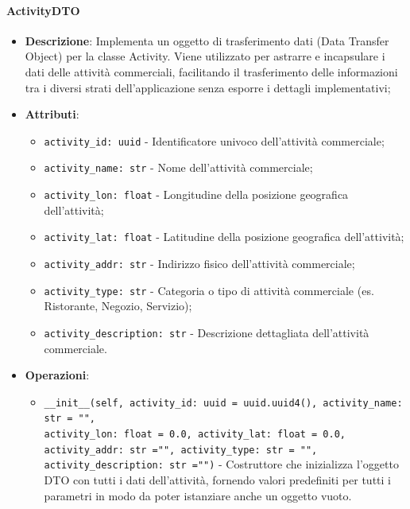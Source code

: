 \documentclass[10pt]{article}
\begin{document}
    \paragraph{ActivityDTO}
    \begin{itemize} 
    \item \textbf{Descrizione}: Implementa un oggetto di trasferimento dati (Data Transfer Object) per la classe Activity. Viene utilizzato per astrarre e incapsulare i dati delle attività commerciali, facilitando il trasferimento delle informazioni tra i diversi strati dell'applicazione senza esporre i dettagli implementativi;
    \item \textbf{Attributi}:
    \begin{itemize}
        \item \texttt{activity\_id: uuid} - Identificatore univoco dell'attività commerciale;
        \item \texttt{activity\_name: str} - Nome dell'attività commerciale;
        \item \texttt{activity\_lon: float} - Longitudine della posizione geografica dell'attività;
        \item \texttt{activity\_lat: float} - Latitudine della posizione geografica dell'attività;
        \item \texttt{activity\_addr: str} - Indirizzo fisico dell'attività commerciale;
        \item \texttt{activity\_type: str} - Categoria o tipo di attività commerciale (es. Ristorante, Negozio, Servizio);
        \item \texttt{activity\_description: str} - Descrizione dettagliata dell'attività commerciale.
    \end{itemize}
    
    \item \textbf{Operazioni}:
    \begin{itemize}
        \item \texttt{\_\_init\_\_(self, activity\_id: uuid = uuid.uuid4(), activity\_name: str = "",\\ activity\_lon: float = 0.0, activity\_lat: float = 0.0, activity\_addr: str ="", activity\_type: str = "", activity\_description: str ="")} - Costruttore che inizializza l'oggetto DTO con tutti i dati dell'attività, fornendo valori predefiniti per tutti i parametri in modo da poter istanziare anche un oggetto vuoto.
    \end{itemize}
    \end{itemize}
    
\end{document}
